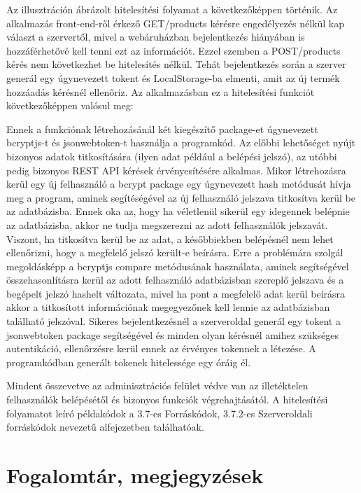 Az illusztráción ábrázolt hitelesítési folyamat a következőképpen történik. Az alkalmazás front-end-ről érkező GET/products kérésre engedélyezés nélkül kap választ a szervertől, mivel a webáruházban bejelentkezés hiányában is hozzáférhetővé kell tenni ezt az információt. Ezzel szemben a POST/products kérés nem következhet be hitelesítés nélkül. Tehát bejelentkezés során a szerver generál egy úgynevezett tokent és LocalStorage-ba elmenti, amit az új termék hozzáadás kérésnél ellenőriz. Az alkalmazásban ez a hitelesítési funkciót következőképpen valósul meg:

Ennek a funkciónak létrehozásánál két kiegészítő package-et úgynevezett bcryptjs-t és jsonwebtoken-t használja a programkód. Az előbbi lehetőséget nyújt bizonyos adatok titkosítására (ilyen adat például a belépési jelszó), az utóbbi pedig bizonyos REST API kérések érvényesítésére alkalmas. Mikor létrehozásra kerül egy új felhasználó a bcrypt package egy úgynevezett hash metódusát hívja meg a program, aminek segítéségével az új felhasználó jelszava titkosítva kerül be az adatbázisba. Ennek oka az, hogy ha véletlenül sikerül egy idegennek belépnie az adatbázisba, akkor ne tudja megszerezni az adott felhasználók jelszavát. Viszont, ha titkosítva kerül be az adat, a későbbiekben belépésnél nem lehet ellenőrizni, hogy a megfelelő jelszó került-e beírásra. Erre a problémára szolgál megoldásképp a bcryptjs compare metódusának használata, aminek segítségével összehasonlításra kerül az adott felhasználó adatbázisban szereplő jelszava és a begépelt jelszó hashelt változata, mivel ha pont a megfelelő adat kerül beírásra akkor a titkosított információnak megegyezőnek kell lennie az adatbázisban található jelszóval. Sikeres bejelentkezésnél a szerveroldal generál egy tokent a jsonwebtoken package segítségével és minden olyan kérésnél amihez szükséges autentikáció, ellenőrzésre kerül ennek az érvényes tokennek a létezése. A programkódban generált tokenek hitelessége egy óráig él.

\bigskip
Mindent összevetve az adminisztrációs felület védve van az illetéktelen felhasználók belépésétől és bizonyos funkciók végrehajtásától. A hitelesítési folyamatot leíró példakódok a 3.7-es Forráskódok, 3.7.2-es Szerveroldali forráskódok nevezetű alfejezetben találhatóak.

\section{Fogalomtár, megjegyzések} %

